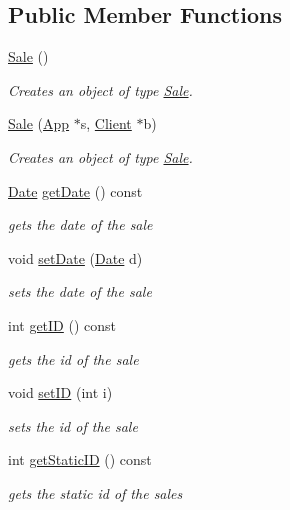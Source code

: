 \subsection*{Public Member Functions}
\begin{DoxyCompactItemize}
\item 
\hyperlink{class_sale_a4b941c26295df31d639351b276a11956}{Sale} ()
\begin{DoxyCompactList}\small\item\em Creates an object of type \hyperlink{class_sale}{Sale}. \end{DoxyCompactList}\item 
\hyperlink{class_sale_acb97b345bbd3c7234e84884ac65235e8}{Sale} (\hyperlink{class_app}{App} $\ast$s, \hyperlink{class_client}{Client} $\ast$b)
\begin{DoxyCompactList}\small\item\em Creates an object of type \hyperlink{class_sale}{Sale}. \end{DoxyCompactList}\item 
\hyperlink{struct_date}{Date} \hyperlink{class_sale_a3750d1f83128f3dbe025f2d22f45c19e}{get\-Date} () const 
\begin{DoxyCompactList}\small\item\em gets the date of the sale \end{DoxyCompactList}\item 
void \hyperlink{class_sale_a8b1b584b89a130d854949cc7753ae00f}{set\-Date} (\hyperlink{struct_date}{Date} d)
\begin{DoxyCompactList}\small\item\em sets the date of the sale \end{DoxyCompactList}\item 
int \hyperlink{class_sale_a13124fc8ab466538a0dd3f72f96c466a}{get\-I\-D} () const 
\begin{DoxyCompactList}\small\item\em gets the id of the sale \end{DoxyCompactList}\item 
void \hyperlink{class_sale_abab34b608ead1777ad551932f4f49c7c}{set\-I\-D} (int i)
\begin{DoxyCompactList}\small\item\em sets the id of the sale \end{DoxyCompactList}\item 
int \hyperlink{class_sale_a6c815bb969ece167f3c2b4d3d0dfcd78}{get\-Static\-I\-D} () const 
\begin{DoxyCompactList}\small\item\em gets the static id of the sales \end{DoxyCompactList}\item 

\end{DoxyCompactItemize}
